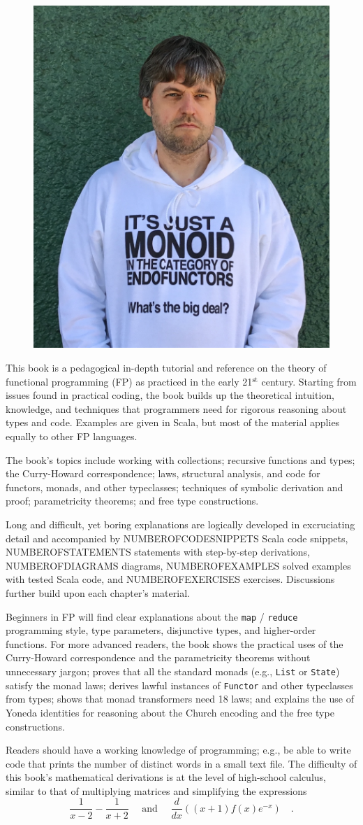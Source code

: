 \documentclass{scrartcl}
\begin{document}
\begin{figure}
\includegraphics[width=0.4\columnwidth]{zloe-lico-monad.jpg}
\vspace{-2.4\baselineskip}
\end{figure}

\noindent
\large
This book is a pedagogical in-depth tutorial and reference
on the theory of functional programming (FP) as practiced in the early
21$^{\text{st}}$ century. Starting from issues found in practical
coding, the book builds up the theoretical intuition, knowledge, and
techniques that programmers need for rigorous reasoning about types
and code. Examples are given in Scala, but most of the material applies equally
to other FP languages.

The book's topics include working with collections; recursive
functions and types; the Curry-Howard correspondence; laws, structural
analysis, and code for functors, monads, and other typeclasses; techniques
of symbolic derivation and proof; parametricity theorems; and free
type constructions.

Long and difficult, yet boring explanations are logically
developed in excruciating detail and accompanied by NUMBEROFCODESNIPPETS
Scala code snippets, NUMBEROFSTATEMENTS statements with step-by-step
derivations, NUMBEROFDIAGRAMS diagrams, NUMBEROFEXAMPLES solved examples
with tested Scala code, and NUMBEROFEXERCISES exercises. Discussions
further build upon each chapter's material.

Beginners in FP will find clear explanations about the \texttt{map} / \texttt{reduce}
programming style, type parameters, disjunctive types, and higher-order
functions. For more advanced readers, the book shows  the practical
uses of the Curry-Howard correspondence and the parametricity theorems
without unnecessary jargon; proves that all the standard monads (e.g.,
\texttt{List} or \texttt{State})
satisfy the monad laws; derives lawful instances of \texttt{Functor}
and other typeclasses from types; shows that monad transformers need
18 laws; and explains the use of Yoneda identities for reasoning about
the Church encoding and the free type constructions.

Readers should have a working knowledge of programming; e.g.,
be able to write code that prints the number of distinct words in
a small text file. The difficulty of this book's mathematical derivations
is at the level of high-school calculus, similar to that of multiplying
matrices and simplifying the expressions
\[
\frac{1}{x-2}-\frac{1}{x+2}\quad\text{ and }\quad\frac{d}{dx}\left((x+1)f(x)e^{-x}\right)\quad.
\]
\end{document}
